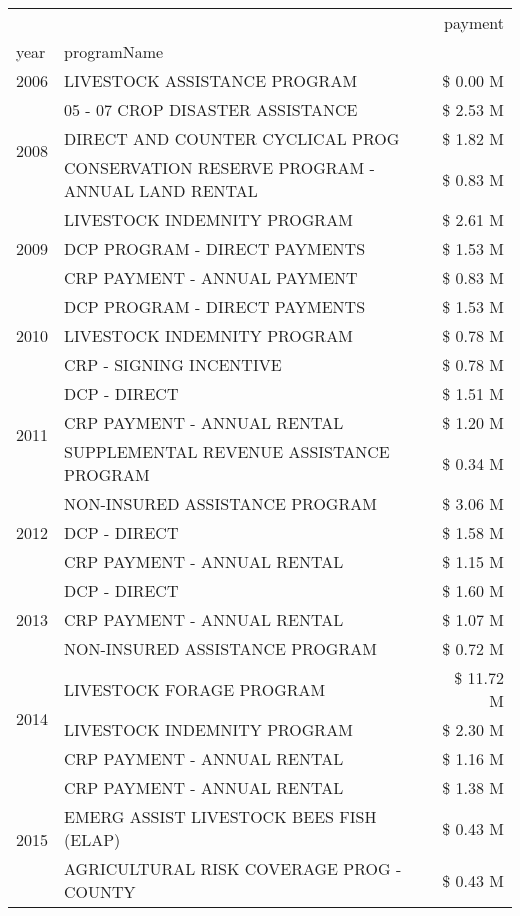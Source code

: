 \begin{tabular}{llr}
\toprule
 &  & payment \\
year & programName &  \\
\midrule
2006 & LIVESTOCK ASSISTANCE PROGRAM & \$ 0.00 M \\
\cline{1-3}
\multirow[t]{3}{*}{2008} & 05 - 07 CROP DISASTER ASSISTANCE & \$ 2.53 M \\
 & DIRECT AND COUNTER CYCLICAL PROG & \$ 1.82 M \\
 & CONSERVATION RESERVE PROGRAM - ANNUAL LAND RENTAL & \$ 0.83 M \\
\cline{1-3}
\multirow[t]{3}{*}{2009} & LIVESTOCK INDEMNITY PROGRAM & \$ 2.61 M \\
 & DCP PROGRAM - DIRECT PAYMENTS & \$ 1.53 M \\
 & CRP PAYMENT - ANNUAL PAYMENT & \$ 0.83 M \\
\cline{1-3}
\multirow[t]{3}{*}{2010} & DCP PROGRAM - DIRECT PAYMENTS & \$ 1.53 M \\
 & LIVESTOCK INDEMNITY PROGRAM & \$ 0.78 M \\
 & CRP - SIGNING INCENTIVE & \$ 0.78 M \\
\cline{1-3}
\multirow[t]{3}{*}{2011} & DCP - DIRECT & \$ 1.51 M \\
 & CRP PAYMENT - ANNUAL RENTAL & \$ 1.20 M \\
 & SUPPLEMENTAL REVENUE ASSISTANCE PROGRAM & \$ 0.34 M \\
\cline{1-3}
\multirow[t]{3}{*}{2012} & NON-INSURED ASSISTANCE PROGRAM & \$ 3.06 M \\
 & DCP - DIRECT & \$ 1.58 M \\
 & CRP PAYMENT - ANNUAL RENTAL & \$ 1.15 M \\
\cline{1-3}
\multirow[t]{3}{*}{2013} & DCP - DIRECT & \$ 1.60 M \\
 & CRP PAYMENT - ANNUAL RENTAL & \$ 1.07 M \\
 & NON-INSURED ASSISTANCE PROGRAM & \$ 0.72 M \\
\cline{1-3}
\multirow[t]{3}{*}{2014} & LIVESTOCK FORAGE PROGRAM & \$ 11.72 M \\
 & LIVESTOCK INDEMNITY PROGRAM & \$ 2.30 M \\
 & CRP PAYMENT - ANNUAL RENTAL & \$ 1.16 M \\
\cline{1-3}
\multirow[t]{3}{*}{2015} & CRP PAYMENT - ANNUAL RENTAL & \$ 1.38 M \\
 & EMERG ASSIST LIVESTOCK BEES FISH (ELAP) & \$ 0.43 M \\
 & AGRICULTURAL RISK COVERAGE PROG - COUNTY & \$ 0.43 M \\

\end{tabular}
